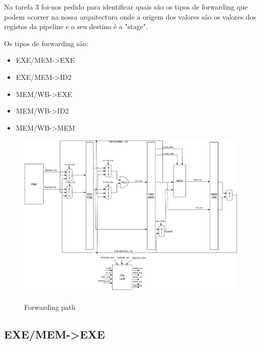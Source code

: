 \documentclass[pdftex,12pt,a4paper]{report}
\begin{document}
Na tarefa 3 foi-nos pedido para identificar quais são os tipos de forwarding que podem ocorrer na nossa arquitectura onde a origem dos valores são os valores dos registos da pipeline e o seu destino é a "stage".

Os tipos de forwarding são:
\begin{itemize}
\item EXE/MEM->EXE
\item EXE/MEM->ID2
\item MEM/WB->EXE
\item MEM/WB->ID2
\item MEM/WB->MEM
\end{itemize} 

\newpage

\begin{figure}[!htb]
\center
 \includegraphics[width=150mm,scale=1]{path.pdf}
 \caption{\\ Forwarding path}
 \label{fig:path}
\end{figure}

\subsection{EXE/MEM->EXE}

\begin{table}[!htb]
\centering
\label{my-label}
\end{table}
\end{document}
